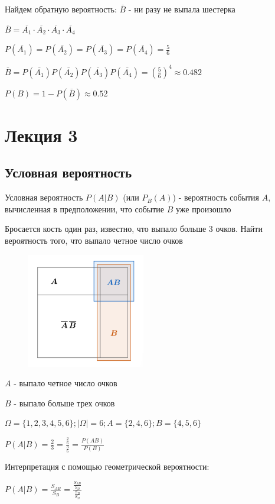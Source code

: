\documentclass[12pt]{article}
\begin{document}
    Найдем обратную вероятность: $\overline{B}$ - ни разу не выпала шестерка

    $\overline{B} = \overline{A_1} \cdot \overline{A_2} \cdot \overline{A_3} \cdot \overline{A_4}$

    $P(\overline{A_1}) = P(\overline{A_2}) = P(\overline{A_3}) = P(\overline{A_4}) = \frac{5}{6}$

    $\overline{B} = P(\overline{A_1}) P(\overline{A_2}) P(\overline{A_3}) P(\overline{A_4}) = \left(\frac{5}{6}\right)^4 \approx 0.482$

    $P(B) = 1 - P(\overline{B}) \approx 0.52$


    \section{Лекция 3}

    \subsection{Условная вероятность}

    Условная вероятность $P(A|B)$ (или $P_B(A)$) - вероятность события $A$, вычисленная в предположении, что событие $B$ уже произошло

    \Ex Бросается кость один раз, известно, что выпало больше 3 очков. Найти вероятность того, что выпало четное число очков

    \smallvspace

    \begin{minipage}{\linewidth}
        \begin{figure}
            \begin{center}
                \includegraphics[height=5cm]{probtheory/images/probtheory_2024_09_17_1}
            \end{center}
        \end{figure}

        $A$ - выпало четное число очков

        $B$ - выпало больше трех очков

        $\Omega = \{1, 2, 3, 4, 5, 6\}; |\Omega| = 6; A = \{2, 4, 6\}; B = \{4, 5, 6\}$

        $P(A|B) = \frac{2}{3} = \frac{\frac{2}{6}}{\frac{3}{6}} = \frac{P(AB)}{P(B)}$


        Интерпретация с помощью геометрической вероятности:

        $P(A|B) = \frac{S_{AB}}{S_B} = \frac{\frac{S_{AB}}{S_\Omega}}{\frac{S_B}{S_\Omega}}$
    \end{minipage}
\end{document}
